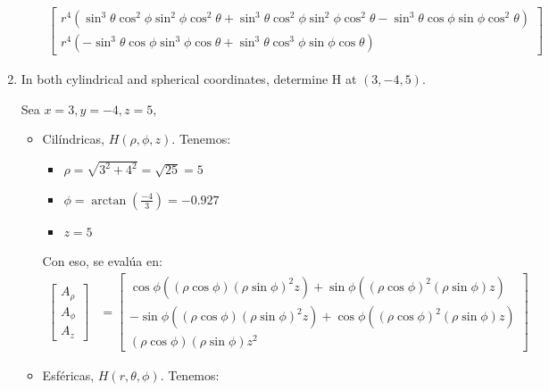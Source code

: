 \begin{problema}
\begin{enumerate}
\begin{sol}
\begin{itemize}
\begin{align*}
\begin{bmatrix}
                        r^4\left(\sin^3\theta\cos^2\phi\sin^2\phi\cos^2\theta + \sin^3\theta\cos^2\phi\sin^2\phi\cos^2\theta-\sin^3\theta\cos\phi\sin\phi\cos^2\theta\right)\\
                        r^4\left(-\sin^3\theta\cos\phi\sin^3\phi\cos\theta + \sin^3\theta\cos^3\phi\sin\phi\cos\theta\right)
                    \end{bmatrix}
                \end{align*}
            \end{itemize}
        \end{sol}
        
        \item In both cylindrical and spherical coordinates, determine $\mathrm{H}$ at $(3,-4,5)$.
        \begin{sol}
            Sea $x=3,y=-4,z=5$, 
            \begin{itemize}
                \item Cilíndricas, $H(\rho,\phi, z)$. Tenemos: 
                \begin{itemize}
                    \item $\rho=\sqrt{3^2+4^2}=\sqrt{25}=5$
                    \item $\phi=\arctan\left(\frac{-4}{3}\right)=-0.927$
                    \item $z=5$
                \end{itemize}
                Con eso, se evalúa en:
                \begin{align*}
                    \begin{bmatrix}
                        A_\rho\\
                        A_\phi\\
                        A_z
                    \end{bmatrix} 
                    &= \begin{bmatrix}
                        \cos\phi((\rho\cos\phi)(\rho\sin\phi)^2z)+ \sin \phi((\rho\cos\phi)^2(\rho\sin \phi)z) \\
                        -\sin \phi((\rho\cos\phi)(\rho\sin\phi)^2z)+ \cos\phi((\rho\cos\phi)^2(\rho\sin \phi)z) \\
                        (\rho \cos\phi)(\rho\sin\phi)z^2
                    \end{bmatrix}
                \end{align*}
                \item Esféricas, $H(r,\theta, \phi)$. Tenemos: 

\end{itemize}
\end{sol}
\end{enumerate}
\end{problema}
